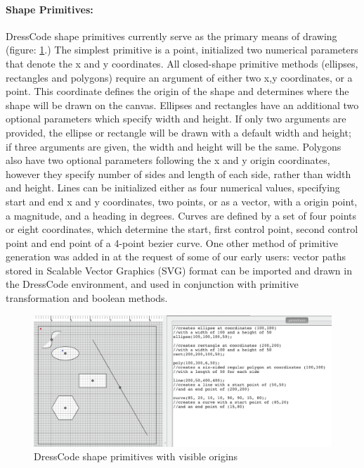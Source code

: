 \paragraph{Shape Primitives:}
DressCode shape primitives currently serve as the primary means of drawing (figure: \ref{fig:shape_primitives}.) The simplest primitive is a point, initialized two numerical parameters that denote the x and y coordinates. All closed-shape primitive methods (ellipses, rectangles and polygons) require an argument of either two x,y coordinates, or a point. This coordinate defines the origin of the shape and determines where  the shape will be drawn on the canvas. Ellipses and rectangles have an additional two optional parameters which specify width and height. If only two arguments are provided, the ellipse or rectangle will be drawn with a default width and height; if three arguments are given, the width and height will be the same. Polygons also have two optional parameters following the x and y origin coordinates, however they specify number of sides and length of each side, rather than width and height. Lines can be initialized either as four numerical values, specifying start and end x and y coordinates, two points, or as a vector, with a origin point,  a magnitude, and a heading in degrees. Curves are defined by a set of four points or eight coordinates, which determine the start, first control point, second control point and end point of a 4-point bezier curve. One other method of primitive generation was added in at the request of some of our early users: vector paths stored in Scalable Vector Graphics (SVG) format can be imported and drawn in the DressCode environment, and used in conjunction with primitive transformation and boolean methods.  

 \begin{center}
\begin{figure}[h!]
\includegraphics[width=6.5in]{images/primitives.png}
\caption{DressCode shape primitives with visible origins}
\label{fig:shape_primitives}
\end{figure}
\end{center} 

